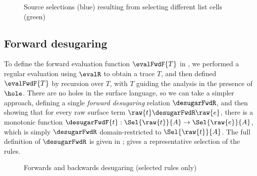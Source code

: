 \begin{figure}
   \begin{subfigure}{0.48\textwidth}
      \small
      
   \end{subfigure}
   \hfill
   \begin{subfigure}{0.48\textwidth}
      \small
      
   \end{subfigure}
   \caption{Source selections (blue) resulting from selecting different list cells (green)}
\label{fig:surface-language:example-1}
\end{figure}

\subsection{Forward desugaring}

To define the forward evaluation function $\evalFwdF{T}$ in , we performed a regular evaluation using $\evalR$ to obtain a trace $T$, and then defined $\evalFwdF{T}$ by recursion over $T$, with $T$ guiding the analysis in the presence of $\hole$. There are no holes in the surface language, so we can take a simpler approach, defining a single \emph{forward desugaring} relation $\desugarFwdR$, and then showing that for every raw surface term $\raw{t} \desugarFwdR \raw{e}$, there is a monotonic function $\desugarFwdF{t}: \Sel{\raw{t}}{A} \to \Sel{\raw{e}}{A}$, which is simply $\desugarFwdR$ domain-restricted to $\Sel{\raw{t}}{A}$. The full definition of $\desugarFwdR$ is \ifappendices given in  \else \IncludedWithSupplementaryMaterial \fi;  gives a representative selection of the rules.

\begin{figure}
   
   \caption{Forwards and backwards desugaring (selected rules only)}
   \label{fig:surface-language:desugar}
\end{figure}

